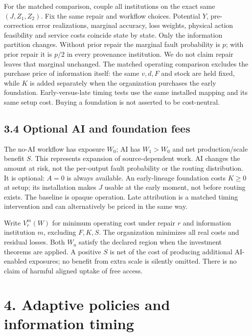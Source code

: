 \documentclass[
  11pt,
  a4paper,
]{article}
\begin{document}
For the matched comparison, couple all institutions on the exact same
\((J,Z_1,Z_2)\). Fix the same repair and workflow choices. Potential
\(Y\), pre-correction error realizations, marginal accuracy, loss
weights, physical action feasibility and service costs coincide state by
state. Only the information partition changes. Without prior repair the
marginal fault probability is \(p\); with prior repair it is \(p/2\) in
every provenance institution. We do not claim repair leaves that
marginal unchanged. The matched operating comparison excludes the
purchase price of information itself: the same \(v,d,F\) and stock are
held fixed, while \(K\) is added separately when the organization
purchases the early foundation. Early-versus-late timing tests use the
same installed mapping and its same setup cost. Buying a foundation is
not asserted to be cost-neutral.

\subsection{3.4 Optional AI and foundation
fees}\label{optional-ai-and-foundation-fees}

The no-AI workflow has exposure \(W_0\); AI has \(W_1>W_0\) and net
production/scale benefit \(S\). This represents expansion of
source-dependent work. AI changes the amount at risk, not the per-output
fault probability or the routing distribution. It is optional: \(A=0\)
is always available. An early-lineage foundation costs \(K\geq0\) at
setup; its installation makes \(J\) usable at the early moment, not
before routing exists. The baseline is opaque operation. Late
attribution is a matched timing intervention and can alternatively be
priced in the same way.

Write \(V_r^m(W)\) for minimum operating cost under repair \(r\) and
information institution \(m\), excluding \(F,K,S\). The organization
minimizes all real costs and residual losses. Both \(W_a\) satisfy the
declared region when the investment theorems are applied. A positive
\(S\) is net of the cost of producing additional AI-enabled exposures;
no benefit from extra scale is silently omitted. There is no claim of
harmful aligned uptake of free access.

\section{4. Adaptive policies and information
timing}\label{adaptive-policies-and-information-timing}
\end{document}
